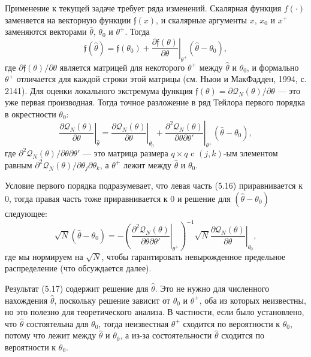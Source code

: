 Применение к текущей задаче требует ряда изменений. Скалярная функция $f(\cdot)$ заменяется на векторную функции $\mathfrak{f}(x)$, и скалярные аргументы $x$, $x_0$ и $x^+$ заменяются векторами $\hat{\theta}$, $\theta_0$ и $\theta^+$. Тогда 
\begin{equation}
\left. \mathfrak{f}(\hat{\theta})=\mathfrak{f}(\theta_0)+\frac{\partial \mathfrak{f}(\theta)}{\partial \theta} \right|_{\theta^+} (\hat{\theta}-\theta_0),
\end{equation}
где $ \partial \mathfrak{f}(\theta)/ \partial \theta$ является матрицей для некоторого $\theta^+$ между $\hat{\theta}$ и $\theta_0$, и формально $\theta^+$ отличается для каждой строки этой матрицы (см. Ньюи и МакФадден, 1994, с. 2141). Для оценки локального экстремума функция $\mathfrak{f}(\theta)= \partial \mathcal{Q}_N(\theta) / \partial \theta$ --- это уже первая производная. Тогда точное разложение в ряд Тейлора первого порядка в окрестности $\theta_0$:
\begin{equation}
\left. \frac{\partial \mathcal{Q}_N(\theta)}{\partial \theta} \right|_{\hat{\theta}} = \left. \frac{\partial \mathcal{Q}_N(\theta)}{\partial \theta} \right|_{\theta_0} + \left. \frac{\partial^2 \mathcal{Q}_N(\theta)}{\partial \theta \partial \theta'} \right|_{\theta^+} (\hat{\theta}-\theta_0),
\end{equation}
где $\partial^2 \mathcal{Q}_N(\theta) / \partial \theta \partial \theta'$ --- это матрица размера $q \times q$ c $(j,k)$-ым элементом равным $\partial^2 \mathcal{Q}_N(\theta) / \partial \theta_j \partial \theta_k$, а $\theta^+$ лежит между $\hat{\theta}$ и $\theta_0$.

Условие первого порядка подразумевает, что левая часть (5.16) приравнивается к 0, тогда правая часть тоже приравнивается к 0 и решение для $(\hat{\theta}-\theta_0)$ следующее:
\begin{equation}
\left. \sqrt{N}(\hat{\theta} - \theta_0)=- \left( \frac{\partial^2 \mathcal{Q}_N(\theta)}{\partial \theta \partial \theta'} \right|_{\theta^+} \right) ^{-1} \sqrt{N} \left. \frac{\partial \mathcal{Q}_N(\theta)} {\partial \theta} \right|_{\theta_0},
\end{equation}
где мы нормируем на $\sqrt{N}$, чтобы гарантировать невырожденное предельное распределение (что обсуждается далее).

Результат (5.17) содержит решение для $\hat{\theta}$. Это не нужно для численного нахождения $\hat{\theta}$, поскольку решение зависит от $\theta_0$ и $\theta^+$, оба из которых неизвестны, но это полезно для теоретического анализа. В частности, если было установлено, что $\hat{\theta}$ состоятельна для $\theta_0$, тогда неизвестная $\theta^+$ сходится по вероятности к $\theta_0$, потому что лежит между $\hat{\theta}$ и $\theta_0$, а из-за состоятельности $\hat{\theta}$ сходится по вероятности к $\theta_0$. 

